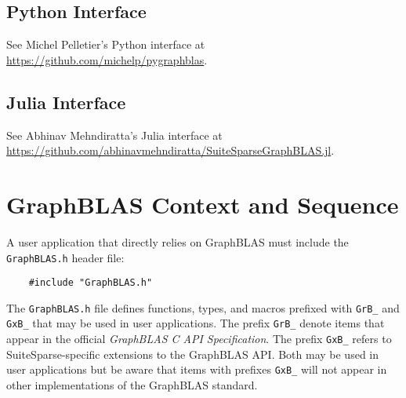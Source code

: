 \documentclass[12pt]{article}
\begin{document}
\subsection{Python Interface} %
\label{python}

See Michel Pelletier's Python interface at
\href{https://github.com/michelp/pygraphblas}{https://github.com/michelp/pygraphblas}.

\subsection{Julia Interface} %
\label{julia}

See Abhinav Mehndiratta's Julia interface at  \\
\href{https://github.com/abhinavmehndiratta/SuiteSparseGraphBLAS.jl}{https://github.com/abhinavmehndiratta/SuiteSparseGraphBLAS.jl}.

\newpage
\section{GraphBLAS Context and Sequence} %
\label{context}

A user application that directly relies on GraphBLAS must include the
\verb'GraphBLAS.h' header file:

\begin{mdframed}[userdefinedwidth=6in]
{\footnotesize
\begin{verbatim}
    #include "GraphBLAS.h"
\end{verbatim}
} \end{mdframed}

The \verb'GraphBLAS.h' file defines functions, types, and macros prefixed with
\verb'GrB_' and \verb'GxB_' that may be used in user applications.  The prefix
\verb'GrB_' denote items that appear in the official {\em GraphBLAS C API
Specification}.  The prefix \verb'GxB_' refers to SuiteSparse-specific
extensions to the GraphBLAS API.  Both may be used in user applications but be
aware that items with prefixes \verb'GxB_' will not appear in other
implementations of the GraphBLAS standard.
\end{document}
